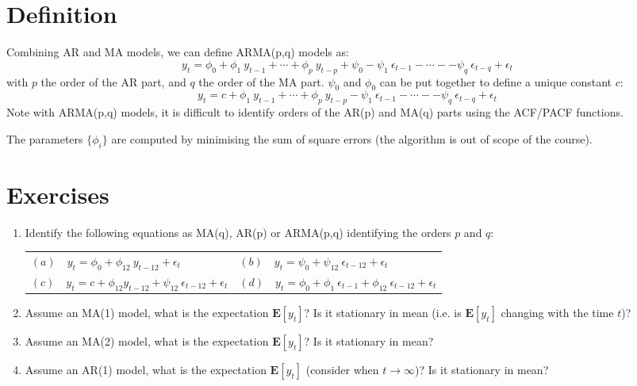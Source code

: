 \documentclass[a4paper,11pt,oneside,onecolumn]{book}
\begin{document}
\section{Definition}
\begin{definition}
Combining AR and MA models, we can define ARMA(p,q) models as:
$$
y_t=\phi_0+\phi_1\ y_{t-1}+\cdots+\phi_{p}\ y_{t-p}+\psi_{0}-\psi_{1}\ \epsilon_{t-1}-\cdots--\psi_{q}\ \epsilon_{t-q}+\epsilon_{t}
$$
with $p$ the order of the AR part, and $q$ the order of the MA part. $\psi_0$ and $\phi_0$ can be put together to define a unique constant $c$:
$$
y_t=c+\phi_1\ y_{t-1}+\cdots+\phi_{p}\ y_{t-p}-\psi_{1}\ \epsilon_{t-1}-\cdots--\psi_{q}\ \epsilon_{t-q}+\epsilon_{t}
$$
Note with ARMA(p,q) models, it is difficult to  identify orders of the AR(p) and MA(q) parts using the ACF/PACF functions. 
\end{definition}
The parameters $\lbrace\phi_i\rbrace$ are computed by minimising the sum of square errors (the algorithm is out of scope of the course). 

\section{Exercises}

\begin{enumerate}
\item Identify the following equations as MA(q), AR(p) or ARMA(p,q) identifying the orders $p$ and $q$:

\begin{tabular}{p{.5\linewidth}p{.5\linewidth}}
$(a)\quad y_t=\phi_0+\phi_{12}\  y_{t-12}+\epsilon_{t}$ &$(b)\quad y_t=\psi_0+\psi_{12}\ \epsilon_{t-12}+\epsilon_{t}$\\
$(c)\quad y_t=c+\phi_{12} y_{t-12}+\psi_{12}\ \epsilon_{t-12}+\epsilon_{t}$ & $(d)\quad y_t=\phi_0+\phi_{1}\ \epsilon_{t-1}+\phi_{12}\ \epsilon_{t-12}+\epsilon_{t}$\\
\end{tabular}

\item  Assume an MA(1) model, what is the expectation $\mathbf{E}[y_t]$? Is it stationary in mean (i.e. is $\mathbf{E}[y_t]$ changing with the time $t$)?

\item  Assume an MA(2) model, what is the expectation $\mathbf{E}[y_t]$? Is it stationary in mean?

\item Assume an AR(1) model, what is the expectation $\mathbf{E}[y_t]$ (consider when $t\rightarrow \infty$)?  Is it stationary in mean?

\end{enumerate}
\end{document}
